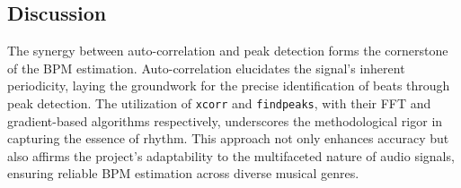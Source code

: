 \subsection{Discussion}

The synergy between auto-correlation and peak detection forms the cornerstone of the BPM estimation. Auto-correlation elucidates the signal's inherent periodicity, laying the groundwork for the precise identification of beats through peak detection. The utilization of \texttt{xcorr} and \texttt{findpeaks}, with their FFT and gradient-based algorithms respectively, underscores the methodological rigor in capturing the essence of rhythm. This approach not only enhances accuracy but also affirms the project's adaptability to the multifaceted nature of audio signals, ensuring reliable BPM estimation across diverse musical genres.

